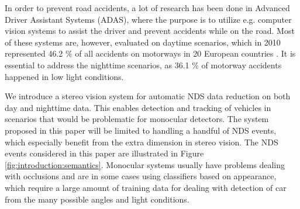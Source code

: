 In order to prevent road accidents, a lot of research has been done in Advanced Driver Assistant Systems (ADAS), where the purpose is to utilize e.g. computer vision systems to assist the driver and prevent accidents while on the road. Most of these systems are, however, evaluated on daytime scenarios, which in 2010 represented 46.2 \% of all accidents on motorways in 20 European countries \cite{euTrafficStats}.
It is essential to address the nighttime scenarios, as 36.1 \% of motorway accidents happened in low light conditions.

We introduce a stereo vision system for automatic NDS data reduction on both day and nighttime data. This enables detection and tracking of vehicles in scenarios that would be problematic for monocular detectors. The system proposed in this paper will be limited to handling a handful of NDS events, which especially benefit from the extra dimension in stereo vision. The NDS events considered in this paper are illustrated in Figure \ref{fig:introduction:semantics}. Monocular systems usually have problems dealing with occlusions and are in some cases using classifiers based on appearance, which require a large amount of training data for dealing with detection of car from the many possible angles and light conditions. 

